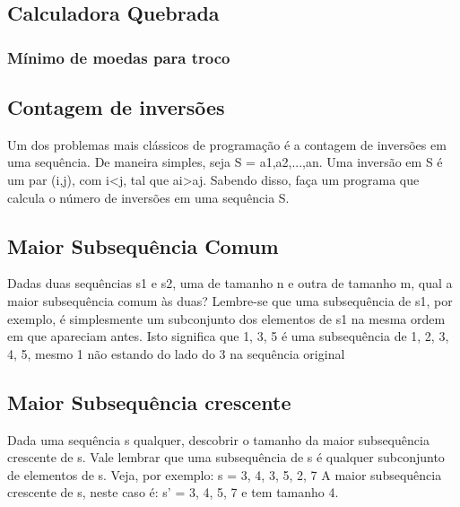 \documentclass[a4paper,12pt]{article}
\begin{document}
\subsection{Calculadora Quebrada}

\subsubsection{Mínimo de moedas para troco}

\subsection{Contagem de inversões}

\indent Um dos problemas mais clássicos de programação é a contagem de inversões em uma sequência. De maneira simples, seja S = a1,a2,...,an. Uma inversão em S é um par (i,j), com i<j, tal que ai>aj. Sabendo disso, faça um programa que calcula o número de inversões em uma sequência S.


\subsection{Maior Subsequência Comum}

\indent Dadas duas sequências s1 e s2, uma de tamanho n e outra de tamanho m, qual a maior subsequência comum às duas? Lembre-se que uma subsequência de s1, por exemplo, é simplesmente um subconjunto dos elementos de s1 na mesma ordem em que apareciam antes. Isto significa que {1, 3, 5} é uma subsequência de {1, 2, 3, 4, 5}, mesmo 1 não estando do lado do 3 na sequência original



\subsection{Maior Subsequência crescente}
Dada uma sequência s qualquer, descobrir o tamanho da maior subsequência crescente de s. Vale lembrar que uma subsequência de s é qualquer subconjunto de elementos de s. Veja, por exemplo:
s = {3, 4, 3, 5, 2, 7}
A maior subsequência crescente de s, neste caso é:
s' = {3, 4, 5, 7}
e tem tamanho 4.
\end{document}
